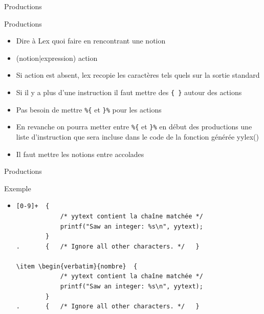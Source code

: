 \def\ftitle{Productions}
\begin{frame}[containsverbatim]{\ftitle}
\def\blocktitle{Productions}
\begin{block}{\blocktitle}
\begin{itemize}
\item Dire à Lex quoi faire en rencontrant une notion
\item (notion|expression) action
\item Si action est absent, lex recopie les caractères tels quels sur la sortie standard
\item Si il y a plus d'une instruction il faut mettre des \verb!{ }! autour des actions
\item Pas besoin de mettre  \verb!%{! et \verb!}%! pour les actions
\item En revanche on pourra metter entre \verb!%{! et \verb!}%! en début des productions une liste d'instruction que sera incluse dans le code de la fonction générée yylex()
\item Il faut mettre les notions entre accolades
\end{itemize}
\end{block}
\end{frame}


\begin{frame}[containsverbatim]{\ftitle}
\def\blocktitle{Exemple}
\begin{block}{\blocktitle}
\begin{itemize}
\item \begin{verbatim}[0-9]+  {
            /* yytext contient la chaîne matchée */
            printf("Saw an integer: %s\n", yytext);
        }
.       {   /* Ignore all other characters. */   }

\item \begin{verbatim}{nombre}  {
            /* yytext contient la chaîne matchée */
            printf("Saw an integer: %s\n", yytext);
        }
.       {   /* Ignore all other characters. */   }
\end{verbatim}
\end{itemize}
\end{block}
\end{frame}

